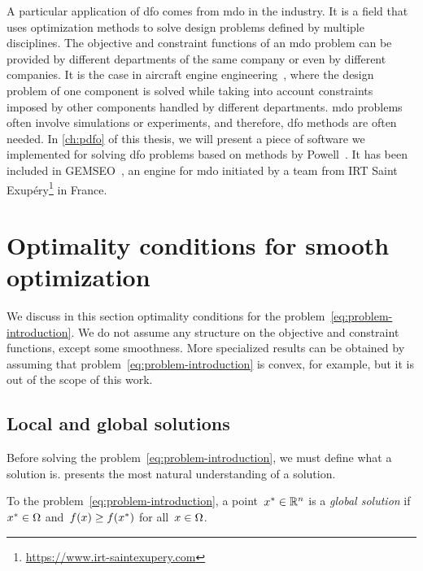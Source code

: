 A particular application of \gls{dfo} comes from \gls{mdo} in the industry.
It is a field that uses optimization methods to solve design problems defined by multiple disciplines.
The objective and constraint functions of an \gls{mdo} problem can be provided by different departments of the same company or even by different companies.
It is the case in aircraft engine engineering~\cite{Gazaix_Etal_2019}, where the design problem of one component is solved while taking into account constraints imposed by other components handled by different departments.
\Gls{mdo} problems often involve simulations or experiments, and therefore, \gls{dfo} methods are often needed.
In \cref{ch:pdfo} of this thesis, we will present a piece of software we implemented for solving \gls{dfo} problems based on methods by Powell~\cite{Powell_1994,Powell_2002,Powell_2006,Powell_2009,Powell_2015}.
It has been included in GEMSEO~\cite{Gallard_Etal_2018}, an engine for \gls{mdo} initiated by a team from IRT Saint Exup{\'{e}}ry\footnote{\url{https://www.irt-saintexupery.com}} in France.

\section{Optimality conditions for smooth optimization}

We discuss in this section optimality conditions for the problem~\cref{eq:problem-introduction}.
We do not assume any structure on the objective and constraint functions, except some smoothness.
More specialized results can be obtained by assuming that problem~\cref{eq:problem-introduction} is convex, for example, but it is out of the scope of this work.

\subsection{Local and global solutions}

Before solving the problem~\cref{eq:problem-introduction}, we must define what a solution is.
 presents the most natural understanding of a solution.

\begin{definition}
    \label{def:global-solution}
    To the problem~\cref{eq:problem-introduction}, a point~$\iter[\ast] \in \R^n$ is a \emph{global solution} if~$\iter[\ast] \in \fset$ and~$\obj(\iter) \ge \obj(\iter[\ast])$ for all~$\iter \in \fset$.
\end{definition}

